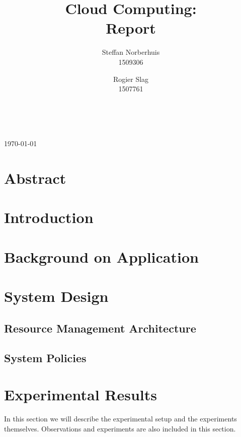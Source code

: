 \documentclass[a4paper]{IEEEtran}
\title{Cloud Computing: \\ Report}
\author{Steffan Norberhuis\\ 1509306 \and
 Rogier Slag\\ 1507761}
\author{
    \IEEEauthorblockN{Steffan Norberhuis, Rogier Slag}\\
    \IEEEauthorblockA{1509306, 1507761}
}
\begin{document}
\maketitle
\begin{center}
\today
\end{center}

\section{Abstract}


\section{Introduction}




\section{Background on Application}



\section{System Design}

\subsection{Resource Management Architecture}






\subsection{System Policies}


\section{Experimental Results}
In this section we will describe the experimental setup and the experiments themselves.
Observations and experiments are also included in this section.
\end{document}
